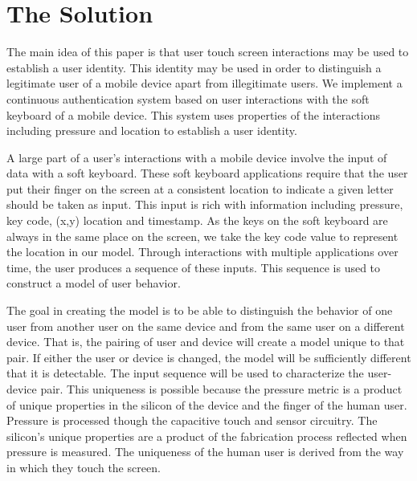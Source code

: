 \section{The Solution}
\label{the_solution}

The main idea of this paper is that user
touch screen interactions may be used 
to establish a user identity.
%
This identity may be used in order to
distinguish a legitimate user of a mobile device apart from
illegitimate users.
%
We implement a continuous authentication system
based on user interactions with the soft keyboard of
a mobile device.
This system uses properties of the interactions including
pressure and location
to establish a user identity.

A large part of a user's interactions with a mobile
device involve the input of data with a soft keyboard.
These soft keyboard applications require that
the user put their finger on the screen at a consistent
location to indicate a given letter should be taken as input.
This input is rich with information including
pressure,
key code,
(x,y) location and
timestamp.
As the keys on the soft keyboard are always in the same place on the screen,
we take the key code value to represent the location in our model.
Through interactions with multiple applications over time,
the user produces a sequence of these inputs.
This sequence is used to construct a model of user behavior.

The goal in creating the model
is to be able to distinguish the behavior
of one user from 
another user on the same device and
from the same user on a different device.
That is, the pairing of user and device will
create a model unique to that pair.
If either the user or device is changed,
the model will be sufficiently different
that it is detectable.
The input sequence will be used to characterize the user-device pair.
%
This uniqueness is possible because
the pressure metric is a product of 
unique properties in
the silicon of the device and
the finger of the human user.
%
Pressure is processed though the capacitive touch and sensor circuitry.
The silicon's unique properties
are a product of the fabrication process %
reflected when pressure is measured.
The uniqueness of the human user is derived from
the way in which they touch the screen.

